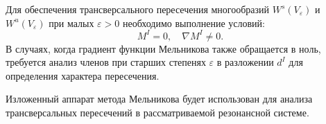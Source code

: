 Для обеспечения трансверсального пересечения многообразий $W^s(V_\varepsilon)$ и $W^u(V_\varepsilon)$ при малых $\varepsilon > 0$ необходимо выполнение условий:
\begin{equation}
M^I = 0, \quad \nabla M^I \neq 0.
\end{equation}
В случаях, когда градиент функции Мельникова также обращается в ноль, требуется анализ членов при старших степенях $\varepsilon$ в разложении $d^I$ для определения характера пересечения.

Изложенный аппарат метода Мельникова будет использован для анализа трансверсальных пересечений в рассматриваемой резонансной системе.